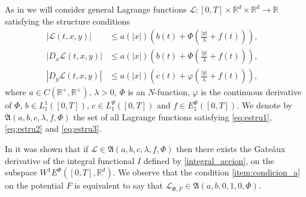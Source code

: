 \documentclass[twoside]{elsarticle}
\theoremstyle{remark}
\newcommand{\lpsi}{L^{\Psi}}
\newcommand{\ephi}{E^{\Phi}}
\newcommand{\wphie}{W^{1}\ephi}
\newcommand{\rr}{\mathbb{R}}
\renewcommand{\leq}{\leqslant}
\begin{document}
As in  \cite{ABGMS2015} we will consider general Lagrange functions
$\mathcal{L}:[0,T]\times\rr^d\times\rr^d\to\rr$
satisfying the structure conditions
\begin{align}
|\mathcal{L}(t,x,y)| &\leq a(|x|)\left(b(t)+ \Phi\left(\frac{|y|}{\lambda}+f(t) \right)\right),&\tag{$A_1$}\label{eq:estru1}
\\
|D_{x}\mathcal{L}(t,x,y)| &\leq a(|x|)\left(b(t)+ \Phi\left(\frac{|y|}{\lambda}+f(t) \right)\right),&\tag{$A_2$}\label{eq:estru2}
\\
|D_{y}\mathcal{L}(t,x,y)| &\leq a(|x|)\left(c(t)+ \varphi\left(\frac{|y|}{\lambda}+f(t)\right)\right),
&\tag{$A_3$}\label{eq:estru3}
\end{align}
where $a\in C(\mathbb{R}^+,\mathbb{R}^+)$, $\lambda>0$, $\Phi$ is an $N$-function,
$\varphi$ is the continuous derivative of $\Phi$,
$b\in L^1_1([0,T])$,  $c\in\lpsi_1([0,T])$ and  $f\in \ephi_1([0,T])$. We denote by $\mathfrak{A}(a,b,c,\lambda,f,\Phi)$ the set of all Lagrange functions satisfying  \eqref{eq:estru1}, \eqref{eq:estru2} and \eqref{eq:estru3}.




In
\cite{ABGMS2015} it was shown that if $\mathcal{L}\in \mathfrak{A}(a,b,c,\lambda,f,\Phi)$ 
then there  exists the Gate\^aux derivative of the integral functional $I$ defined by \eqref{integral_accion}, 
on the subspace $\wphie([0,T],\rr^d)$. We observe that the condition \ref{item:condicion_a} on the potential $F$ is equivalent to say that $\mathcal{L}_{\Phi,F}\in \mathfrak{A}(a,b,0,1,0,\Phi)$.
\end{document}
